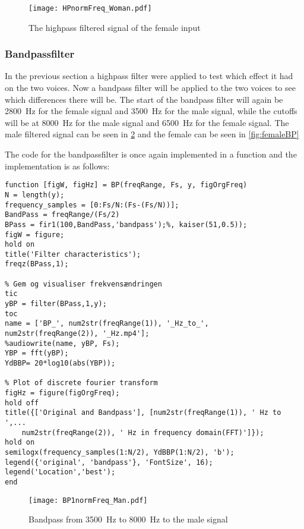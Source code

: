 \begin{figure}[h]
	\centering
	\texttt{[image: HPnormFreq\_Woman.pdf]}
	\caption{The highpass filtered signal of the female input}
	\label{fig:HPFemale}
\end{figure}


\subsubsection{Bandpassfilter}
\label{sec:Bandpass}
In the previous section a highpass filter were applied to test which effect it had on the two voices. Now a bandpass filter will be applied to the two voices to see which differences there will be. The start of the bandpass filter will again be \SI{2800}{\hertz} for the female signal and \SI{3500}{\hertz} for the male signal, while the cutoffs will be at \SI{8000}{\hertz} for the male signal and \SI{6500}{\hertz} for the female signal. The male filtered signal can be seen in \cref{fig:maleBP} and the female can be seen in \cref{fig:femaleBP}

The code for the bandpassfilter is once again implemented in a function and the implementation is as follows:

\begin{verbatim}
function [figW, figHz] = BP(freqRange, Fs, y, figOrgFreq)
N = length(y);
frequency_samples = [0:Fs/N:(Fs-(Fs/N))];
BandPass = freqRange/(Fs/2)
BPass = fir1(100,BandPass,'bandpass');%, kaiser(51,0.5));
figW = figure;
hold on
title('Filter characteristics');
freqz(BPass,1);

% Gem og visualiser frekvensændringen
tic
yBP = filter(BPass,1,y);
toc
name = ['BP_', num2str(freqRange(1)), '_Hz_to_', num2str(freqRange(2)), '_Hz.mp4'];
%audiowrite(name, yBP, Fs);
YBP = fft(yBP);
YdBBP= 20*log10(abs(YBP));

% Plot of discrete fourier transform
figHz = figure(figOrgFreq);
hold off
title({['Original and Bandpass'], [num2str(freqRange(1)), ' Hz to ',...
	num2str(freqRange(2)), ' Hz in frequency domain(FFT)']});
hold on
semilogx(frequency_samples(1:N/2), YdBBP(1:N/2), 'b');
legend({'original', 'bandpass'}, 'FontSize', 16);
legend('Location','best');
end
\end{verbatim}



\begin{figure}[h]
\centering
\texttt{[image: BP1normFreq\_Man.pdf]}
\caption{Bandpass from \SI{3500}{\hertz} to \SI{8000}{\hertz} to the male signal}
\label{fig:maleBP}
\end{figure}

